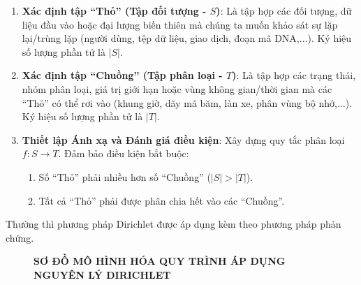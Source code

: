 \documentclass[12pt,a4paper]{article}
\theoremstyle{definition}
\begin{document}
\begin{enumerate}[label=\textbf{Bước \arabic*:}, leftmargin=1.5cm, itemsep=2pt, topsep=4pt]
    \item \textbf{Xác định tập ``Thỏ'' (Tập đối tượng - $S$)}: Là tập hợp các đối tượng, dữ liệu đầu vào hoặc đại lượng biến thiên mà chúng ta muốn khảo sát sự lặp lại/trùng lặp (người dùng, tệp dữ liệu, giao dịch, đoạn mã DNA,...). Ký hiệu số lượng phần tử là $|S|$.
    
    \item \textbf{Xác định tập ``Chuồng'' (Tập phân loại - $T$)}: Là tập hợp các trạng thái, nhóm phân loại, giá trị giới hạn hoặc vùng không gian/thời gian mà các ``Thỏ'' có thể rơi vào (khung giờ, dãy mã băm, làn xe, phân vùng bộ nhớ,...). Ký hiệu số lượng phần tử là $|T|$.
    
    \item \textbf{Thiết lập Ánh xạ và Đánh giá điều kiện}: Xây dựng quy tắc phân loại $f: S \to T$. Đảm bảo điều kiện bắt buộc:
    \begin{enumerate}[label=\arabic*., leftmargin=0.8cm, itemsep=1pt, topsep=2pt]
        \item Số ``Thỏ'' phải nhiều hơn số ``Chuồng'' ($|S| > |T|$).
        \item Tất cả ``Thỏ'' phải được phân chia hết vào các ``Chuồng''.
    \end{enumerate}
\end{enumerate}
\noindent Thường thì phương pháp Dirichlet được áp dụng kèm theo phương pháp phản chứng. 
\vspace{0.3cm}

\begin{figure}[h!]
    \centering
    \begin{mdframed}[
        backgroundcolor=gray!10,
        linecolor=black,
        linewidth=0.8pt,
        innerleftmargin=10pt,
        innerrightmargin=10pt,
        innertopmargin=10pt,
        innerbottommargin=12pt
    ]
        \centering
        \textbf{\large SƠ ĐỒ MÔ HÌNH HÓA QUY TRÌNH ÁP DỤNG NGUYÊN LÝ DIRICHLET} \\[0.5cm]
        
    \end{mdframed}
\end{figure}
\end{document}
